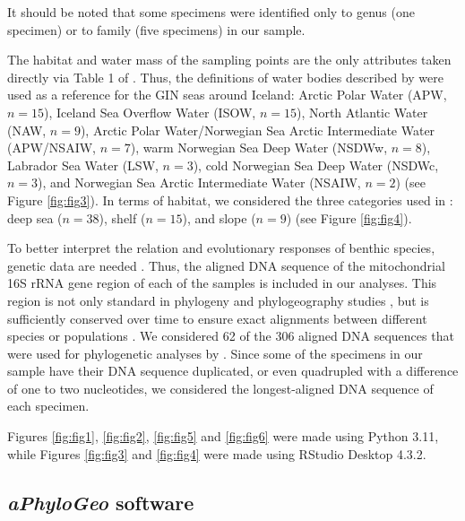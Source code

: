 It should be noted that some specimens were identified only to genus (one specimen) or to family (five specimens) in our sample.
 
The habitat and water mass of the sampling points are the only attributes taken directly via Table 1 of \citep{uhlir_adding_2021}. Thus, the definitions of water bodies described by \citep{hansen_north_2000, brix2010distribution, ostmann_marine_2014} were used as a reference for the GIN seas around Iceland: Arctic Polar Water (APW, $n=15$), Iceland Sea Overflow Water (ISOW, $n=15$), North Atlantic Water (NAW, $n=9$), Arctic Polar Water/Norwegian Sea Arctic Intermediate Water (APW/NSAIW, $n=7$), warm Norwegian Sea Deep Water (NSDWw, $n=8$), Labrador Sea Water (LSW, $n=3$), cold Norwegian Sea Deep Water (NSDWc, $n=3$), and Norwegian Sea Arctic Intermediate Water (NSAIW, $n=2$) (see Figure \ref{fig:fig3}). In terms of habitat, we considered the three categories used in \citep{uhlir_adding_2021}: deep sea ($n=38$), shelf ($n=15$), and slope ($n=9$) (see Figure \ref{fig:fig4}).

To better interpret the relation and evolutionary responses of benthic species, genetic data are needed \citep{wilson_speciation_1987, uhlir_adding_2021}. Thus, the aligned DNA sequence of the mitochondrial 16S rRNA gene region of each of the samples is included in our analyses. This region is not only standard in phylogeny and phylogeography studies \citep{hugenholtz1998impact}, but is sufficiently conserved over time to ensure exact alignments between different species or populations \citep{saccone1999evolutionary}. We considered 62 of the 306 aligned DNA sequences that were used for phylogenetic analyses by \citep{uhlir_adding_2021}. Since some of the specimens in our sample have their DNA sequence duplicated, or even quadrupled with a difference of one to two nucleotides, we considered the longest-aligned DNA sequence of each specimen. 

Figures \ref{fig:fig1}, \ref{fig:fig2}, \ref{fig:fig5} and \ref{fig:fig6} were made using Python 3.11, while Figures \ref{fig:fig3} and \ref{fig:fig4} were made using RStudio Desktop 4.3.2.

\subsection{\textit{aPhyloGeo} software}

